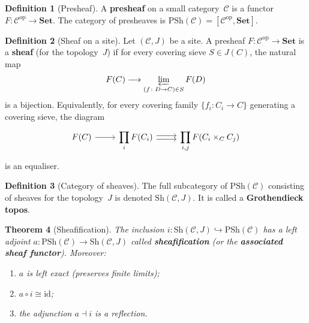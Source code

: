 \documentclass[a4paper,12pt]{book}
\newcommand{\Set}{\mathbf{Set}}
\newcommand{\op}{\mathrm{op}}
\newcommand{\id}{\mathrm{id}}
\theoremstyle{definition}
\newtheorem{definition}{Definition}[section]
\theoremstyle{plain}
\newtheorem{theorem}[definition]{Theorem}
\theoremstyle{remark}
\begin{document}

\begin{definition}[Presheaf]\label{def:presheaf-reminder}
A \textbf{presheaf} on a small category~$\mathcal{C}$ is a functor
$F\colon\mathcal{C}^{\op}\to\Set$.  The category of presheaves is
$\mathrm{PSh}(\mathcal{C}) = [\mathcal{C}^{\op}, \Set]$.
\end{definition}

\begin{definition}[Sheaf on a site]\label{def:sheaf-site}
Let $(\mathcal{C}, J)$ be a site.  A presheaf $F\colon\mathcal{C}^{\op}\to\Set$
is a \textbf{sheaf} (for the topology~$J$) if for every covering sieve
$S\in J(C)$, the natural map
\[
    F(C) \longrightarrow \varprojlim_{(f\colon D\to C)\in S} F(D)
\]
is a bijection.  Equivalently, for every covering family
$\{f_i\colon C_i\to C\}$ generating a covering sieve, the diagram
\[
\begin{tikzcd}
F(C) \arrow[r] &
\displaystyle\prod_i F(C_i)
  \arrow[r, shift left=0.5ex]
  \arrow[r, shift right=0.5ex] &
\displaystyle\prod_{i,j} F(C_i\times_C C_j)
\end{tikzcd}
\]
is an equaliser.
\end{definition}

\begin{definition}[Category of sheaves]\label{def:sheaf-cat}
The full subcategory of $\mathrm{PSh}(\mathcal{C})$ consisting of
sheaves for the topology~$J$ is denoted
$\mathrm{Sh}(\mathcal{C}, J)$.  It is called a
\textbf{Grothendieck topos}.
\end{definition}

\begin{theorem}[Sheafification]\label{thm:sheafification}
The inclusion $i\colon\mathrm{Sh}(\mathcal{C},J)\hookrightarrow
\mathrm{PSh}(\mathcal{C})$ has a left adjoint
$a\colon\mathrm{PSh}(\mathcal{C})\to\mathrm{Sh}(\mathcal{C},J)$
called \textbf{sheafification} (or the \textbf{associated sheaf functor}).
Moreover:
\begin{enumerate}[label=(\alph*)]
\item $a$ is left exact (preserves finite limits);
\item $a\circ i \cong \id$;
\item the adjunction $a\dashv i$ is a reflection.
\end{enumerate}
\end{theorem}
\end{document}
